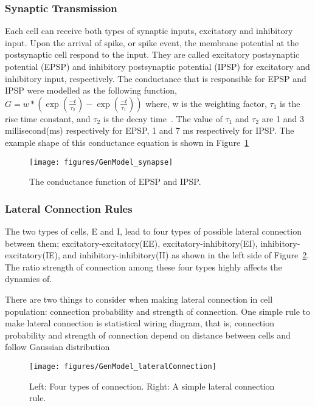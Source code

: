 \subsubsection{Synaptic Transmission}
Each cell can receive both types of synaptic inputs, excitatory and inhibitory input. Upon the arrival of spike, or spike event, the membrane potential at the postsynaptic cell respond to the input. They are called excitatory postsynaptic potential (EPSP) and inhibitory postsynaptic potential (IPSP) for excitatory and inhibitory input, respectively. 
The conductance that is responsible for EPSP and IPSP were modelled as the following function,
$G = w*(\exp(\frac{-t}{\tau_2} ) - \exp(\frac{-t}{\tau_1}))$
where, w is the weighting factor, $\tau_1$ is the rise time constant, and $\tau_2$ is the decay time~\cite {carnevale2006neuron}.
The value of $\tau_1$ and $\tau_2$ are 1 and 3 millisecond(ms) respectively for EPSP, 1 and 7 ms respectively for IPSP. The example shape of this conductance equation is shown in Figure~\ref{fig:GenModel_synapse}

\begin{figure}[!ht]
	\centering
	\texttt{[image: figures/GenModel\_synapse]}
	\caption{The conductance function of EPSP and IPSP.}
	\label{fig:GenModel_synapse}
\end{figure}

\subsubsection{Lateral Connection Rules}
The two types of cells, E and I, lead to four types of possible lateral connection between them; excitatory-excitatory(EE), excitatory-inhibitory(EI), inhibitory-excitatory(IE), and inhibitory-inhibitory(II) as shown in the left side of Figure~\ref{fig:GM_lateral}. The ratio strength of connection among these four types highly affects the dynamics of.

There are two things to consider when making lateral connection in cell population: connection probability and strength of connection. One simple rule to make lateral connection is statistical wiring diagram, that is, connection probability and strength of connection depend on distance between cells and follow Gaussian distribution~\cite{mclaughlin2000neuronal, ringach2004haphazard}

\begin{figure}
	\centering
	\texttt{[image: figures/GenModel\_lateralConnection]}
	\caption[The lateral connection.]{ Left: Four types of connection. Right: A simple lateral connection rule.}
	\label{fig:GM_lateral}
\end{figure}

